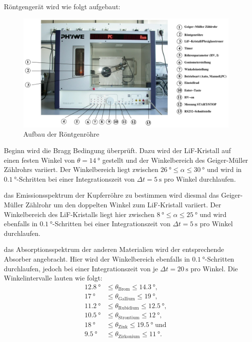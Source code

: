 \newpage
{}\justifying Röntgengerät wird wie folgt aufgebaut:
\begin{figure}[H]
    \centering
    \includegraphics[width=\textwidth]{./images/Röntgenröhre.jpg}
    \caption{Aufbau der Röntgenröhre \cite{V602}}
    \label{fig:1}
\end{figure}
\justifying Beginn wird die Bragg Bedingung überprüft. Dazu wird der LiF-Kristall auf einen festen Winkel von $\theta=\SI{14}{\degree}$ gestellt und der
Winkelbereich des Geiger-Müller Zählrohrs variiert. Der Winkelbereich liegt zwischen $\SI{26}{\degree}\leq\alpha\leq\SI{30}{\degree}$ und wird in
$\SI{0.1}{\degree}$-Schritten bei einer Integrationszeit von $\Delta t=\SI{5}{\second}$ pro Winkel durchlaufen. 

\justifying das Emissionsspektrum der Kupferröhre zu bestimmen wird diesmal das Geiger-Müller Zählrohr um den doppelten Winkel
zum LiF-Kristall variiert. Der Winkelbereich des LiF-Kristalls liegt hier zwischen $\SI{8}{\degree}\leq\alpha\leq\SI{25}{\degree}$ und wird ebenfalls in 
$\SI{0.1}{\degree}$-Schritten bei einer Integrationszeit von $\Delta t=\SI{5}{\second}$ pro Winkel durchlaufen.

\justifying das Absorptionsspektrum der anderen Materialien wird der entsprechende Absorber angebracht. Hier wird der Winkelbereich
ebenfalls in $\SI{0.1}{\degree}$-Schritten durchlaufen, jedoch bei einer Integrationszeit von je $\Delta t=\SI{20}{\second}$ pro Winkel.
Die Winkelintervalle lauten wie folgt:\\
\begin{align*}
    \SI{12.8}{\degree}  &\leq\theta_{\text{Brom}}\leq\SI{14.3}{\degree},\\ 
    \SI{17}{\degree}    &\leq\theta_{\text{Gallium}}\leq\SI{19}{\degree},\\
    \SI{11.2}{\degree}  &\leq\theta_{\text{Rubidium}}\leq\SI{12.5}{\degree},\\
    \SI{10.5}{\degree}  &\leq\theta_{\text{Strontium}}\leq\SI{12}{\degree},\\
    \SI{18}{\degree}    &\leq\theta_{\text{Zink}}\leq\SI{19.5}{\degree}\;\text{und}\\
    \SI{9.5}{\degree}   &\leq\theta_{\text{Zirkonium}}\leq\SI{11}{\degree}.
\end{align*}


